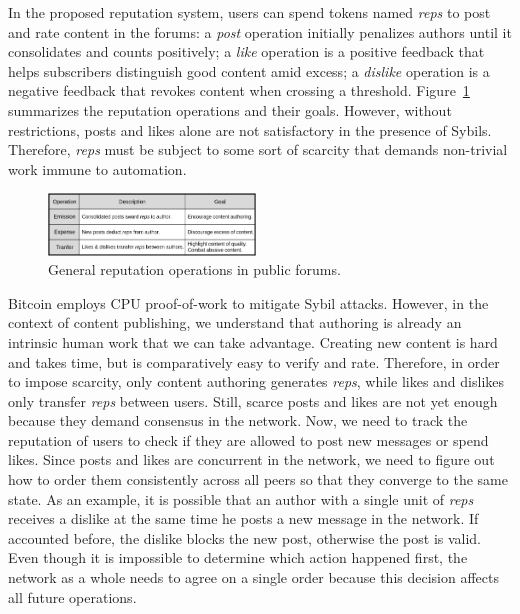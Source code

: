 \documentclass[10pt,journal,compsoc]{IEEEtran}
\newcommand{\reps}     {\emph{reps}\xspace}
\begin{document}
In the proposed reputation system, users can spend tokens named \reps to post
and rate content in the forums:
a \emph{post} operation initially penalizes authors until it consolidates and
counts positively;
a \emph{like} operation is a positive feedback that helps subscribers
distinguish good content amid excess;
a \emph{dislike} operation is a negative feedback that revokes content when
crossing a threshold.
Figure~\ref{fig.general} summarizes the reputation operations and their goals.
%
However, without restrictions, posts and likes alone are not satisfactory in
the presence of Sybils.
Therefore, \reps must be subject to some sort of scarcity that demands
non-trivial work immune to automation.

\begin{figure}
\centering
\includegraphics[width=0.49\textwidth]{general.png}
\caption{General reputation operations in public forums.}
\label{fig.general}
\end{figure}

Bitcoin employs CPU proof-of-work to mitigate Sybil attacks.
However, in the context of content publishing, we understand that authoring is
already an intrinsic human work that we can take advantage.
Creating new content is hard and takes time, but is comparatively easy to
verify and rate.
Therefore, in order to impose scarcity, only content authoring generates \reps,
while likes and dislikes only transfer \reps between users.
%
Still, scarce posts and likes are not yet enough because they demand consensus
in the network.
Now, we need to track the reputation of users to check if they are allowed to
post new messages or spend likes.
Since posts and likes are concurrent in the network, we need to figure out how
to order them consistently across all peers so that they converge to the same
state.
As an example, it is possible that an author with a single unit of \reps
receives a dislike at the same time he posts a new message in the network.
If accounted before, the dislike blocks the new post, otherwise the post is
valid.
Even though it is impossible to determine which action happened first, the
network as a whole needs to agree on a single order because this decision
affects all future operations.
\end{document}
